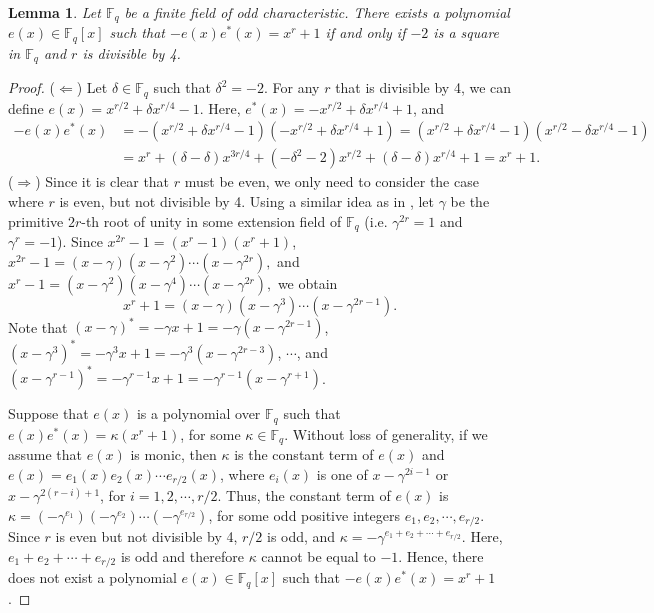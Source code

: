 \documentclass[12pt]{article}
\newtheorem{lemma}[theorem]{Lemma}
\begin{document}
	\begin{lemma}\label{charnega}
		Let $\mathbb{F}_q$ be a finite field of odd characteristic. There exists a polynomial $e(x)\in\mathbb{F}_q[x]$ such that $-e(x)e^{*}(x)=x^r+1$ if and only if $-2$ is a square in $\mathbb{F}_q$ and $r$ is divisible by 4.
	\end{lemma}
	\begin{proof}
		($\Leftarrow$) Let $\delta\in\mathbb{F}_q$ such that $\delta^2=-2$. For any $r$ that is divisible by 4, we can define $e(x)=x^{r/2}+\delta x^{r/4}-1$. Here, $e^{*}(x)=-x^{r/2}+\delta x^{r/4}+1$, and \begin{align*}
			-e(x)e^{*}(x)&=-(x^{r/2}+\delta x^{r/4}-1)(-x^{r/2}+\delta x^{r/4}+1)=(x^{r/2}+\delta x^{r/4}-1)(x^{r/2}-\delta x^{r/4}-1)\\
			&=x^r+(\delta-\delta)x^{3r/4}+(-\delta^2-2)x^{r/2}+(\delta-\delta)x^{r/4}+1=x^r+1.
		\end{align*}
		($\Rightarrow$) Since it is clear that $r$ must be even, we only need to consider the case where $r$ is even, but not divisible by 4. Using a similar idea as in \cite{Boripan2021}, let $\gamma$ be the primitive $2r$-th root of unity in some extension field of $\mathbb{F}_q$ (i.e. $\gamma^{2r}=1$ and $\gamma^r=-1$). Since $x^{2r}-1=(x^r-1)(x^r+1)$, $x^{2r}-1=(x-\gamma)(x-\gamma^2)\cdots(x-\gamma^{2r}),$ and $x^r-1=(x-\gamma^2)(x-\gamma^4)\cdots(x-\gamma^{2r}),$ we obtain $$x^r+1=(x-\gamma)(x-\gamma^3)\cdots (x-\gamma^{2r-1}).$$ Note that $(x-\gamma)^{*}=-\gamma x+1=-\gamma(x-\gamma^{2r-1})$, $(x-\gamma^3)^{*}=-\gamma^3 x+1=-\gamma^3(x-\gamma^{2r-3})$, $\cdots$, and $(x-\gamma^{r-1})^{*}=-\gamma^{r-1} x+1=-\gamma^{r-1}(x-\gamma^{r+1})$.
		
		Suppose that $e(x)$ is a polynomial over $\mathbb{F}_q$ such that $e(x)e^{*}(x)=\kappa (x^r+1)$, for some $\kappa\in\mathbb{F}_q$. Without loss of generality, if we assume that $e(x)$ is monic, then $\kappa$ is the constant term of $e(x)$ and $e(x)=e_1(x)e_2(x)\cdots e_{r/2}(x)$, where $e_i(x)$ is one of $x-\gamma^{2i-1}$ or $x-\gamma^{2(r-i)+1}$, for $i=1,2,\cdots,r/2$. Thus, the constant term of $e(x)$ is $\kappa=(-\gamma^{e_1})(-\gamma^{e_2})\cdots(-\gamma^{e_{r/2}})$, for some odd positive integers $e_1,e_2,\cdots,e_{r/2}$. Since $r$ is even but not divisible by 4, $r/2$ is odd, and $\kappa=-\gamma^{e_1+e_2+\cdots+e_{r/2}}$. Here, $e_1+e_2+\cdots+e_{r/2}$ is odd and therefore $\kappa$ cannot be equal to $-1$. Hence, there does not exist a polynomial $e(x)\in\mathbb{F}_q[x]$ such that $-e(x)e^{*}(x)=x^r+1$.
	\end{proof}
\end{document}
